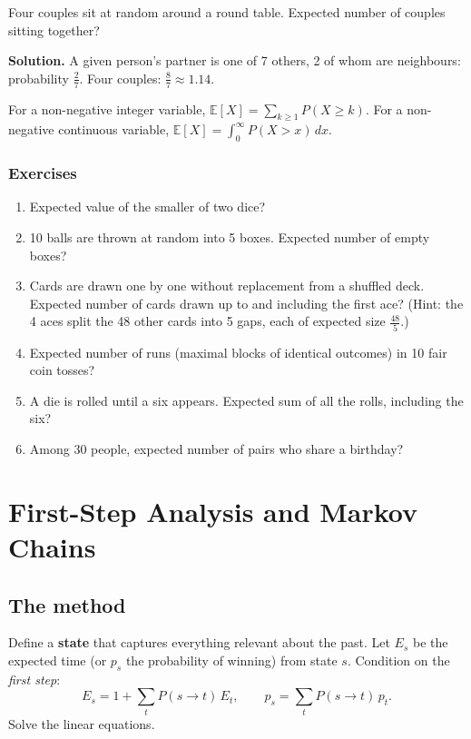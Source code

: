 \documentclass[11pt,a4paper,openany]{report}
\newenvironment{exercises}{\subsection*{Exercises \thechapter}\begin{enumerate}[label=\textbf{\thechapter.\arabic*},leftmargin=3.2em]}{\end{enumerate}}
\newcommand{\E}{\mathbb{E}}
\begin{document}
\begin{example}
Four couples sit at random around a round table. Expected number of couples sitting together?

\textbf{Solution.} A given person's partner is one of 7 others, 2 of whom are neighbours: probability $\frac27$. Four couples: $\frac87\approx\mathbf{1.14}$.
\end{example}

\begin{shortcut}
For a non-negative integer variable, $\E[X]=\sum_{k\ge1}P(X\ge k)$. For a non-negative continuous variable, $\E[X]=\int_0^\infty P(X>x)\,dx$.
\end{shortcut}

\begin{exercises}
\item Expected value of the smaller of two dice?
\item 10 balls are thrown at random into 5 boxes. Expected number of empty boxes?
\item Cards are drawn one by one without replacement from a shuffled deck. Expected number of cards drawn up to and including the first ace? (Hint: the 4 aces split the 48 other cards into 5 gaps, each of expected size $\frac{48}5$.)
\item Expected number of runs (maximal blocks of identical outcomes) in 10 fair coin tosses?
\item A die is rolled until a six appears. Expected sum of all the rolls, including the six?
\item Among 30 people, expected number of pairs who share a birthday?
\end{exercises}

\chapter{First-Step Analysis and Markov Chains}\label{ch:fsa}

\section{The method}
\begin{idea}
Define a \textbf{state} that captures everything relevant about the past. Let $E_s$ be the expected time (or $p_s$ the probability of winning) from state $s$. Condition on the \emph{first step}:
\[E_s=1+\sum_{t}P(s\to t)\,E_t,\qquad p_s=\sum_tP(s\to t)\,p_t.\]
Solve the linear equations.
\end{idea}
\end{document}
